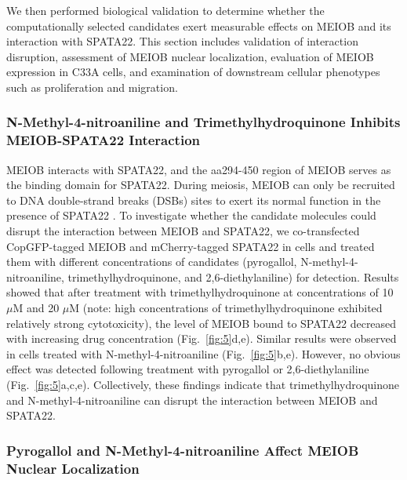 \documentclass[preprint,12pt]{elsarticle}
\theoremstyle{plain}
\theoremstyle{definition}
\theoremstyle{remark}
\begin{document}
We then performed biological validation to determine whether the computationally selected candidates exert measurable effects on MEIOB and its interaction with SPATA22. This section includes validation of interaction disruption, assessment of MEIOB nuclear localization, evaluation of MEIOB expression in C33A cells, and examination of downstream cellular phenotypes such as proliferation and migration.


\subsubsection*{N-Methyl-4-nitroaniline and Trimethylhydroquinone Inhibits MEIOB-SPATA22 Interaction}

MEIOB interacts with SPATA22, and the aa294-450 region of MEIOB serves as the binding domain for SPATA22. During meiosis, MEIOB can only be recruited to DNA double-strand breaks (DSBs) sites to exert its normal function in the presence of SPATA22 \cite{1,2}. To investigate whether the candidate molecules could disrupt the interaction between MEIOB and SPATA22, we co-transfected CopGFP-tagged MEIOB and mCherry-tagged SPATA22 in cells and treated them with different concentrations of candidates (pyrogallol, N-methyl-4-nitroaniline, trimethylhydroquinone, and 2,6-diethylaniline) for detection. Results showed that after treatment with trimethylhydroquinone at concentrations of 10 $\mu$M and 20 $\mu$M (note: high concentrations of trimethylhydroquinone exhibited relatively strong cytotoxicity), the level of MEIOB bound to SPATA22 decreased with increasing drug concentration (Fig.~\ref{fig:5}d,e). Similar results were observed in cells treated with N-methyl-4-nitroaniline (Fig.~\ref{fig:5}b,e). However, no obvious effect was detected following treatment with pyrogallol or 2,6-diethylaniline (Fig.~\ref{fig:5}a,c,e). Collectively, these findings indicate that trimethylhydroquinone and N-methyl-4-nitroaniline can disrupt the interaction between MEIOB and SPATA22.




\subsubsection*{Pyrogallol and N-Methyl-4-nitroaniline Affect MEIOB Nuclear Localization}
\end{document}
